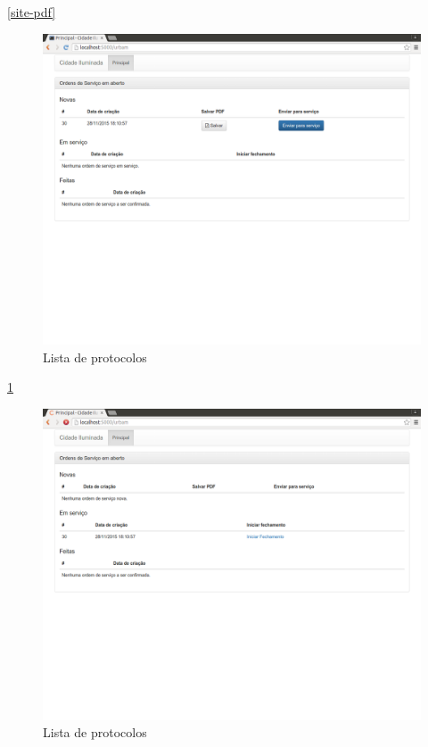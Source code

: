 \documentclass[
	article,			%
	11pt,				%
	oneside,			%
	a4paper,			%
	english,			%
	brazil,				%
	sumario=tradicional
	]{abntex2}
\begin{document}
\ref{site-pdf}

\begin{figure}[!htbp]
 \centering
 \caption{\label{site-visao-urbam}Lista de protocolos}
 \includegraphics[scale=0.25]{site/13-urbam.png}
\end{figure}

\ref{site-visao-urbam}
\clearpage

\begin{figure}[!htbp]
 \centering
 \caption{\label{site-servico-os}Lista de protocolos}
 \includegraphics[scale=0.25]{site/14-servico_os.png}
\end{figure}
\end{document}
